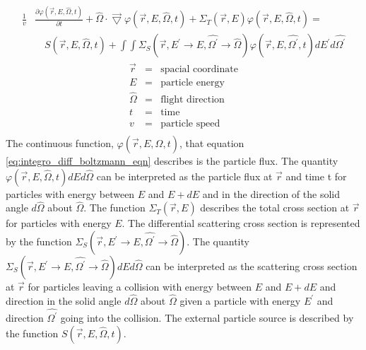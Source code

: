 \begin{equation}
  \begin{split}
    \frac{1}{v}&\frac{\partial \varphi(\vec{r},E,\hat{\Omega},t)}{\partial t} +
    \hat{\Omega} \cdot \vec{\bigtriangledown} \varphi(\vec{r},E,\hat{\Omega},t)
    + \Sigma_T(\vec{r},E) \varphi(\vec{r},E,\hat{\Omega},t) = \\
    & \quad S(\vec{r},E,\hat{\Omega},t) +
    \int\int \Sigma_S(\vec{r},E^{'} \to E,\hat{\Omega^{'}} \to \hat{\Omega})
    \varphi(\vec{r},E,\hat{\Omega^{'}},t) dE^{'}d\hat{\Omega^{'}} 
  \end{split}
  \label{eq:integro_diff_boltzmann_eqn}
\end{equation}
\begin{eqnarray*}
  \vec{r} & = & \text{spacial coordinate} \nonumber \\
  E & = & \text{particle energy} \nonumber \\
  \hat{\Omega} & = & \text{flight direction} \nonumber \\
  t & = & \text{time} \nonumber \\
  v & = & \text{particle speed} \nonumber \\
\end{eqnarray*}
The continuous function, $\varphi(\vec{r},E,\hat{\Omega},t)$, that equation 
\ref{eq:integro_diff_boltzmann_eqn} describes is the particle flux. The
quantity $\varphi(\vec{r},E,\hat{\Omega},t)dEd\hat{\Omega}$ can be interpreted
as the particle flux at $\vec{r}$ and time t for particles with energy between
$E$ and $E + dE$ and in the direction of the solid angle $d\hat{\Omega}$ about
$\hat{\Omega}$. The function $\Sigma_T(\vec{r},E)$ describes the total cross
section at $\vec{r}$ for particles with energy $E$. The differential scattering
cross section is represented by the function 
$\Sigma_S(\vec{r},E^{'} \to E,\hat{\Omega^{'}} \to \hat{\Omega})$. The quantity
$\Sigma_S(\vec{r},E^{'} \to E,\hat{\Omega^{'}} \to \hat{\Omega})dEd\hat{\Omega}$
can be interpreted as the scattering cross section at $\vec{r}$ for particles
leaving a collision with energy between $E$ and $E+dE$ and direction in the
solid angle $d\hat{\Omega}$ about $\hat{\Omega}$ given a particle with energy
$E^{'}$ and direction $\hat{\Omega^{'}}$ going into the collision. The external
particle source is described by the function $S(\vec{r},E,\hat{\Omega},t)$.

